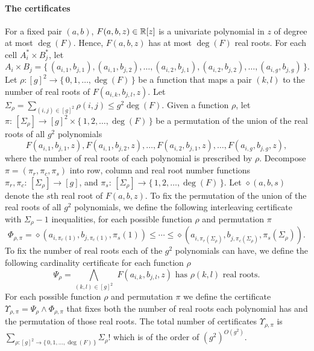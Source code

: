 \paragraph{The certificates}
For a fixed pair $(a,b)$, $F(a,b,z) \in \mathbb{R}[z]$ is a univariate polynomial in $z$ of
degree at most $\deg(F)$. Hence, $F(a,b,z)$ has at most $\deg(F)$ real roots.
For each cell $A_i^* \times B_j^*$, let
\begin{displaymath}
	A_i\times B_j=\{\,
		(a_{i,1},b_{j,1}),
		(a_{i,1},b_{j,2}),
		\ldots,
		(a_{i,2},b_{j,1}),
		(a_{i,2},b_{j,2}),
		\ldots,
		(a_{i,g},b_{j,g})
	\,\}.
\end{displaymath}
Let $\rho
\colon {[g]}^2 \to \{\,0,1,\ldots,\deg(F)\,\}$ be a function that maps a pair $(k,l)$ to the
number of real roots of $F(a_{i,k},b_{j,l},z)$. Let $\Sigma_\rho = \sum_{(i,j)
\in {[g]}^2} \rho(i,j) \le g^2 \deg(F)$.
Given a function $\rho$, let
$\pi\colon\,[\Sigma_\rho]\to {[g]}^2 \times
\{\,1,2,\ldots,\deg(F)\,\}$ be a permutation of the union of the real roots of all
$g^2$ polynomials
\begin{displaymath}
F(a_{i,1},b_{j,1},z),
F(a_{i,1},b_{j,2},z),
\ldots,
F(a_{i,2},b_{j,1},z),
\ldots,
F(a_{i,g},b_{j,g},z),
\end{displaymath}
where the number of real roots of each polynomial is
prescribed by $\rho$.
Decompose $\pi = (\pi_r,\pi_c,\pi_s)$ into
row,
column and real root number functions $\pi_r,\pi_c\colon\,[\Sigma_\rho]\to[g]$,
and $\pi_s\colon\,[\Sigma_\rho]\to\{\,1,2,\ldots,\deg(F)\,\}$.
Let $\diamond(a,b,s)$ denote the $s$th real root of $F(a,b,z)$.
To fix the permutation of the union of the real roots of all
$g^2$ polynomials, we define the following
interleaving certificate with $\Sigma_\rho - 1$ inequalities, for each possible
function $\rho$ and permutation $\pi$
\begin{displaymath}
	\Phi_{\rho,\pi} =
	\diamond(a_{i,\pi_r(1)},b_{j,\pi_c(1)},\pi_s(1))
	\le
	\cdots
	\le
	\diamond(a_{i,\pi_r(\Sigma_\rho)},b_{j,\pi_c(\Sigma_\rho)},\pi_s(\Sigma_\rho)).
\end{displaymath}
To fix the number of real roots each of the $g^2$ polynomials can have, we
define the following cardinality certificate for each function $\rho$
\begin{displaymath}
	\Psi_{\rho} =
	\bigwedge_{(k,l)\in{[g]}^2}\,\,
	F(a_{i,k},b_{j,l},z)\,\,\text{has $\rho(k,l)$ real roots}.
\end{displaymath}
For each possible function $\rho$ and permutation $\pi$ we define the
certificate $\Upsilon_{\rho,\pi} = \Psi_\rho \land \Phi_{\rho,\pi}$ that
fixes both the number of real roots each polynomial has and the permutation of
those real roots.
The total number of certificates $\Upsilon_{\rho,\pi}$ is
$\sum_{\rho\colon {[g]}^2 \to \{\,0,1,\ldots,\deg(F)\,\}} {\Sigma_\rho!}$
which is of the order of ${(g^2)}^{O(g^2)}$.

